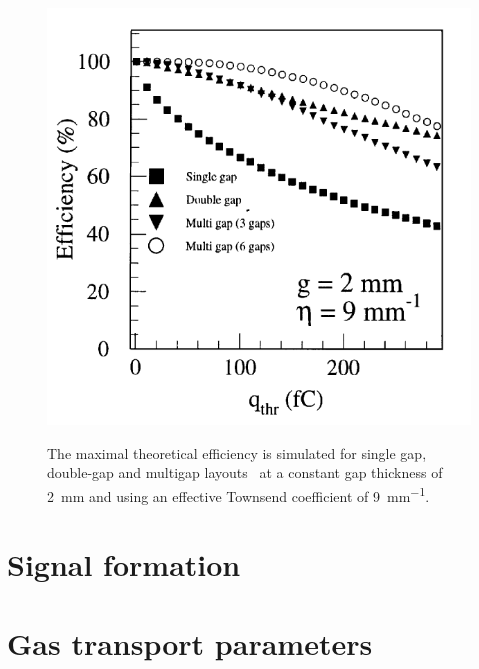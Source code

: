 	\begin{figure}[!h]
		\centering
		\includegraphics[width = 0.6\plotwidth]{fig/chapt3/Layout_eff_vs_thr.png}\\
		\caption{\label{fig:EffThreshold} The maximal theoretical efficiency is simulated for single gap, double-gap and multigap layouts~\cite{ABBRESCIA99} at a constant gap thickness of \SI{2}{mm} and using an effective Townsend coefficient of \SI{9}{mm^{-1}}.}
	\end{figure}

\section{Signal formation}
\label{chapt3:sec:signal}

\section{Gas transport parameters}
\label{chapt3:sec:transport}



\clearpage{\pagestyle{empty}\cleardoublepage}
